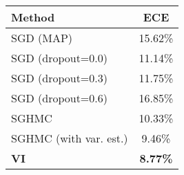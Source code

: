 \begin{tabular}{lc}
\toprule
                Method &             ECE \\
\midrule
             SGD (MAP) &         15.62\% \\
     SGD (dropout=0.0) &         11.14\% \\
     SGD (dropout=0.3) &         11.75\% \\
     SGD (dropout=0.6) &         16.85\% \\
                 SGHMC &         10.33\% \\
SGHMC (with var. est.) &          9.46\% \\
           \textbf{VI} & \textbf{8.77\%} \\
\bottomrule
\end{tabular}

